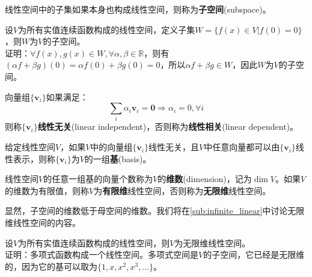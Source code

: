 \documentclass{ctexbook}
\begin{document}
\begin{definition}[子空间]
    线性空间中的子集如果本身也构成线性空间，则称为\textbf{子空间}(subspace)。
\end{definition}

\begin{example}
    设$V$为所有实值连续函数构成的线性空间，定义子集$W=\{f(x)\in V|f(0)=0\}$，则$W$为$V$的子空间。\\
    证明：$\forall f(x),g(x)\in W,\forall \alpha,\beta\in \mathbb{R}$，则有$(\alpha f+\beta g)(0)=\alpha f(0)+\beta g(0)=0$，所以$\alpha f+\beta g\in W$，因此$W$为$V$的子空间。
\end{example}

\begin{definition}[线性无关]
    向量组$\{\mathbf{v}_i\}$如果满足：
    $$\sum_i \alpha_i \mathbf{v}_i=\mathbf{0}\Rightarrow \alpha_i=0,\forall i$$
    则称$\{\mathbf{v}_i\}$\textbf{线性无关}(linear independent)，否则称为\textbf{线性相关}(linear dependent)。
\end{definition}

\begin{definition}[基]
    给定线性空间$V$，如果$V$中的向量组$\{\mathbf{v}_i\}$线性无关，且$V$中任意向量都可以由$\{\mathbf{v}_i\}$线性表示，则称$\{\mathbf{v}_i\}$为$V$的一组\textbf{基}(basis)。
\end{definition}


\begin{definition}[维数]
    线性空间$V$的任意一组基的向量个数称为$V$的\textbf{维数}(dimension)，记为$\dim V$。如果$V$的维数为有限值，则称$V$为\textbf{有限维}线性空间，否则称为\textbf{无限维}线性空间。
\end{definition}

显然，子空间的维数低于母空间的维数。我们将在\ref{sub:infinite_linear}中讨论无限维线性空间的内容。

\begin{example}
    设$V$为所有实值连续函数构成的线性空间，则$V$为无限维线性空间。\\
    证明：多项式函数构成一个线性空间。多项式空间是$V$的子空间，它已经是无限维的，因为它的基可以取为$\{1,x,x^2,x^3,\ldots\}$。
\end{example}
\end{document}
